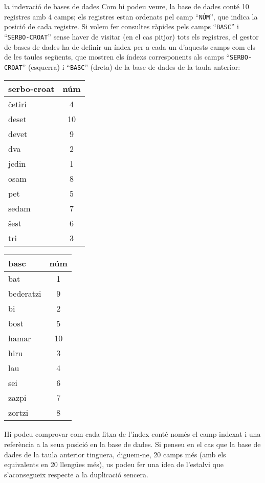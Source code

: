 \begin{persabermes}{la indexació de bases de dades}
 Com hi podeu veure, la base de dades conté 10 registres amb 4 camps;
 els registres estan ordenats pel camp ``\texttt{NÚM}'', que indica la
 posició de cada registre. Si volem fer consultes ràpides pels camps
 ``\texttt{BASC}'' i ``\texttt{SERBO-CROAT}'' sense haver de visitar
 (en el cas pitjor) tots els registres, el gestor de bases de dades ha
 de definir un índex per a cada un d'aquests camps com els de les
 taules següents, que mostren els índexs corresponents als camps
 ``\texttt{SERBO-CROAT}'' (esquerra) i ``\texttt{BASC}'' (dreta) de la
 base de dades de la taula anterior:
 \begin{center}
 \parbox{0.25\textwidth}{
 \begin{tabular}{lc}
 \hline
 {\sc serbo-croat} & {\sc núm} \\
 \hline
 \hline
 \v{c}etiri &     4 \\
 deset &      10 \\
 devet &      9 \\
 dva &        2 \\
 jedin &      1 \\
 osam &       8 \\
 pet &        5 \\
 sedam &      7 \\
 \v{s}est &       6 \\
 tri &        3 \\
 \hline
 \end{tabular}}%
\hspace{0.2\textwidth}%
\parbox{0.25\textwidth}{
   \begin{tabular}{lc}
   \hline
   {\sc basc\phantom{o-croat}} & {\sc núm} \\
   \hline
   \hline
  bat &       1 \\
  bederatzi  & 9 \\  
  bi &        2 \\   
  bost &      5 \\   
  hamar &     10 \\   
  hiru &       3 \\   
  lau &       4 \\   
  sei &        6 \\    
  zazpi &      7 \\ 
  zortzi &    8 \\
   \hline
   \end{tabular}}%
  \end{center}
  Hi podeu comprovar com cada fitxa de l'índex conté només el camp
  indexat i una referència a la seua posició en la base de dades. Si
  penseu en el cas que la base de dades de la taula anterior tinguera,
  diguem-ne, 20 camps més (amb els equivalents en 20 llengües més), us
  podeu fer una idea de l'estalvi que s'aconsegueix respecte a la
  duplicació sencera.
\end{persabermes}

